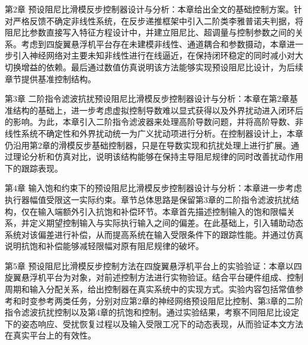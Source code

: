 第2章 预设阻尼比滑模反步控制器设计与分析：本章给出全文的基础控制方案。针对严格反馈不确定非线性系统，在反步递推框架中引入二阶类李雅普诺夫判据，将阻尼比参数直接写入特征方程设计中，并建立阻尼比、超调量与控制参数之间的关系。考虑到四旋翼悬浮机平台存在未建模非线性、通道耦合和参数摄动，本章进一步引入神经网络对主要未知非线性进行在线逼近，在保持闭环稳定的同时减小对大切换增益的依赖。最后通过数值仿真说明该方法能够实现预设阻尼比设计，为后续章节提供基准控制结构。

第3章 二阶指令滤波抗扰预设阻尼比滑模反步控制器设计与分析：本章在第2章基准结构的基础上，进一步考虑虚拟控制导数难以显式获得以及外界扰动进入闭环后的影响。为此，本章引入二阶指令滤波器来处理高阶导数问题，并将高阶导数、非线性系统不确定性和外界扰动统一为广义扰动项进行分析。在控制器设计上，本章仍沿用第2章的滑模反步基础控制器，只是在导数实现和抗扰处理上进行扩展。通过理论分析和仿真对比，说明该结构能够在保持主导阻尼规律的同时改善扰动作用下的跟踪表现。

第4章 输入饱和约束下的预设阻尼比滑模反步控制器设计与分析：本章进一步考虑执行器幅值受限这一实际约束。章节总体思路是保留第3章的二阶指令滤波抗扰结构，仅在输入端额外引入抗饱和补偿环节。本章首先描述控制输入的饱和限幅关系，并定义期望控制输入与实际执行输入之间的偏差。在此基础上，引入辅助动态系统对该偏差进行补偿，从而提高系统在输入受限条件下的跟踪性能。并通过仿真说明抗饱和补偿能够减轻限幅对原有阻尼规律的破坏。

第5章 预设阻尼比滑模反步控制方法在四旋翼悬浮机平台上的实验验证：本章以四旋翼悬浮机平台为对象，对前述控制方法进行实物验证。结合平台硬件组成、控制周期和输入分配关系，给出控制器在真实系统中的实现方式。实验内容包括常值参考和时变参考两类任务，分别对应第2章的神经网络预设阻尼比控制、第3章的二阶指令滤波抗扰控制以及第4章的抗饱和控制。通过实验结果，考察不同阻尼比设定下的姿态响应、受扰恢复过程以及输入受限工况下的动态表现，从而验证本文方法在真实平台上的有效性。
